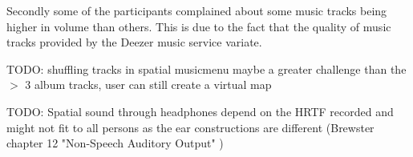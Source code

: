 Secondly some of the participants complained about some music tracks being higher in volume than others. This is due to the fact that the quality of music tracks provided by the Deezer music service variate.

TODO: shuffling tracks in spatial musicmenu maybe a greater challenge than the $>$ 3 album tracks, user can still create a virtual map

TODO: Spatial sound through headphones depend on the HRTF recorded and might not fit to all persons as the ear constructions are different (Brewster chapter 12 "Non-Speech Auditory Output" \cite{brewster_human-computer_2003})




















